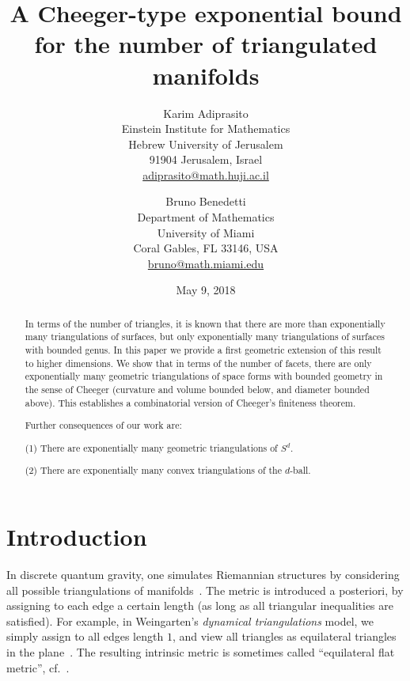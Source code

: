 \documentclass[a4paper,11pt]{article}
\theoremstyle{plain}
\theoremstyle{definition}
\begin{document}
\author{
Karim Adiprasito\\
\small Einstein Institute for Mathematics\\ \small Hebrew University of Jerusalem\\
\small 91904 Jerusalem, Israel\\
\small \url{adiprasito@math.huji.ac.il}
\and
\and 
Bruno Benedetti \\
\small Department of Mathematics\\ \small University of Miami\\
\small Coral Gables, FL 33146, USA\\
\small \url{bruno@math.miami.edu}}


\date{\small May 9, 2018}
\title{A Cheeger-type exponential bound for the number of triangulated manifolds}
\maketitle
\bfseries

\mdseries


\begin{abstract}
In terms of the number of triangles, it is known that there are more than exponentially many triangulations of surfaces, but only exponentially many triangulations of surfaces with bounded genus. In this paper we provide a first geometric extension of this result to higher dimensions. We show that in terms of the number of facets, there are only exponentially many geometric triangulations of space forms with bounded geometry in the sense of Cheeger (curvature and volume bounded below, and diameter bounded above). This establishes a combinatorial version of Cheeger's finiteness theorem. 

\noindent Further consequences of our work are:

(1) There are exponentially many geometric triangulations of $S^d$. 

(2) There are exponentially many convex triangulations of the $d$-ball.
\end{abstract}

\section{Introduction}
In discrete quantum gravity, one simulates Riemannian structures by considering all possible triangulations of manifolds~\cite{Regge, ADJ, Weingarten}. The metric is introduced a posteriori, by assigning to each edge a certain length (as long as all triangular inequalities are satisfied). For example, in Weingarten's \emph{dynamical triangulations} model,  we simply assign to all edges length $1$, and view all triangles as equilateral triangles in the plane~\cite{ADJ, Weingarten}. The resulting intrinsic metric is  sometimes called ``equilateral flat metric'', cf.~\cite{AB-part1}.
\end{document}
